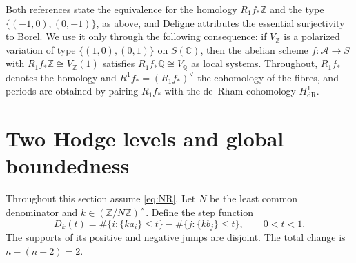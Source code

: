 \documentclass[11pt]{amsart}
\theoremstyle{definition}
\theoremstyle{remark}
\numberwithin{equation}{section}
\newcommand{\Q}{\mathbb{Q}}
\newcommand{\Z}{\mathbb{Z}}
\newcommand{\C}{\mathbb{C}}
\newcommand{\cA}{\mathcal{A}}
\begin{document}
Both references state the equivalence for the homology $R_1f_*\Z$ and the type $\{(-1,0),(0,-1)\}$, as above, and Deligne attributes the essential surjectivity to Borel. We use it only through the following consequence: if $V_\Z$ is a polarized variation of type $\{(1,0),(0,1)\}$ on $S(\C)$, then the abelian scheme $f:\cA\to S$ with $R_1f_*\Z\cong V_\Z(1)$ satisfies $R_1f_*\Q\cong V_\Q$ as local systems. Throughout, $R_1f_*$ denotes the homology and $R^1f_*=(R_1f_*)^\vee$ the cohomology of the fibres, and periods are obtained by pairing $R_1f_*$ with the de~Rham cohomology $H^1_{\mathrm{dR}}$.

\section{Two Hodge levels and global boundedness}\label{sec:twolevel}

Throughout this section assume \eqref{eq:NR}. Let $N$ be the least common denominator and $k\in(\Z/N\Z)^\times$. Define the step function
\[
D_k(t)=\#\{i:\{ka_i\}\le t\}-\#\{j:\{kb_j\}\le t\},\qquad0<t<1.
\]
The supports of its positive and negative jumps are disjoint. The total change is $n-(n-2)=2$.
\end{document}
